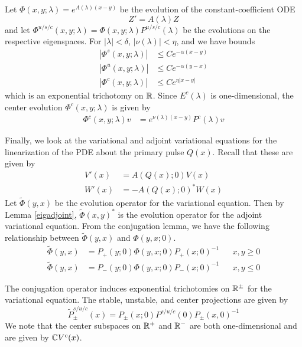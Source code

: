 \documentclass[thesis.tex]{subfiles}
\begin{document}
Let $\Phi(x, y; \lambda) = e^{A(\lambda)(x-y)}$ be the evolution of the constant-coefficient ODE
\[
Z' = A(\lambda) Z
\]
and let $\Phi^{u/s/c}(x, y; \lambda) = \Phi(x, y; \lambda)P^{u/s/c}(\lambda)$ be the evolutions on the respective eigenspaces. For $|\lambda| < \delta$, $|\nu(\lambda)| < \eta$, and we have bounds
\begin{equation}\label{Zevolbounds}
\begin{aligned}
|\Phi^s(x, y; \lambda)| &\leq C e^{-\alpha(x - y)} \\
|\Phi^u(x, y; \lambda)| &\leq C e^{-\alpha(y - x)} \\
|\Phi^c(x, y; \lambda)| &\leq C e^{\eta|x - y|} 
\end{aligned}
\end{equation}
which is an exponential trichotomy on $\mathbb{R}$. Since $E^c(\lambda)$ is one-dimensional, the center evolution $\Phi^c(x, y; \lambda)$ is given by
\begin{align}\label{centerevol}
\Phi^c(x, y; \lambda) v &= e^{\nu(\lambda)(x - y)} P^c(\lambda)v
\end{align}

Finally, we look at the variational and adjoint variational equations for the linearization of the PDE about the primary pulse $Q(x)$. Recall that these are given by 
\begin{align*}
V'(x) &= A(Q(x); 0) V(x) \\
W'(x) &= -A(Q(x); 0)^* W(x)
\end{align*}
Let $\tilde{\Phi}(y, x)$ be the evolution operator for the variational equation. Then by Lemma \ref{eigadjoint}, $\tilde{\Phi}(x, y)^*$ is the evolution operator for the adjoint variational equation. From the conjugation lemma, we have the following relationship between $\tilde{\Phi}(y, x)$ and $\Phi(y, x; 0)$.
\begin{align*}
\tilde{\Phi}(y, x) &= P_+(y; 0) \Phi(y, x; 0) P_+(x; 0)^{-1} && x, y \geq 0 \\
\tilde{\Phi}(y, x) &= P_-(y; 0) \Phi(y, x; 0) P_-(x; 0)^{-1} && x, y \leq 0
\end{align*}

The conjugation operator induces exponential trichotomies on $\mathbb{R}^\pm$ for the variational equation. The stable, unstable, and center projections are given by
\begin{equation}\label{trichotomyprojunconj}
\tilde{P}^{s/u/c}_\pm(x) = P_\pm(x; 0) P^{s/u/c}(0) P_\pm(x, 0)^{-1}
\end{equation}
We note that the center subspaces on $\mathbb{R}^+$ and $\mathbb{R}^-$ are both one-dimensional and are given by $\mathbb{C} V^c(x)$. 
\end{document}
